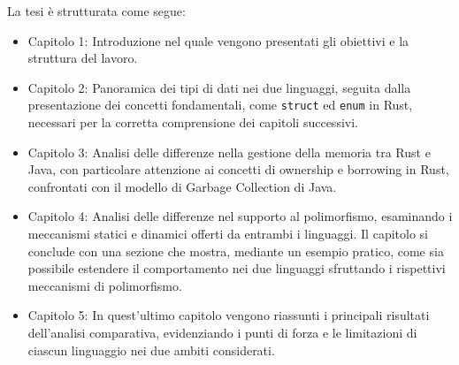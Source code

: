 La tesi è strutturata come segue: 
\begin{itemize}
    \item Capitolo 1: Introduzione nel quale vengono presentati gli obiettivi e la struttura del lavoro.
    \item Capitolo 2: Panoramica dei tipi di dati nei due linguaggi, seguita dalla presentazione dei concetti fondamentali, come \texttt{struct} ed \texttt{enum} in Rust, necessari per la corretta comprensione dei capitoli successivi. 
    \item Capitolo 3: Analisi delle differenze nella gestione della memoria tra Rust e Java, con particolare attenzione ai concetti di ownership e borrowing in Rust, confrontati con il modello di Garbage Collection di Java.
    \item Capitolo 4: Analisi delle differenze nel supporto al polimorfismo, esaminando i meccanismi statici e dinamici offerti da entrambi i linguaggi. Il capitolo si conclude con una sezione che mostra, mediante un esempio pratico, come sia possibile estendere il comportamento nei due linguaggi sfruttando i rispettivi meccanismi di polimorfismo.
    \item Capitolo 5: In quest'ultimo capitolo vengono riassunti i principali risultati dell'analisi comparativa, evidenziando i punti di forza e le limitazioni di ciascun linguaggio nei due ambiti considerati. 
\end{itemize}
